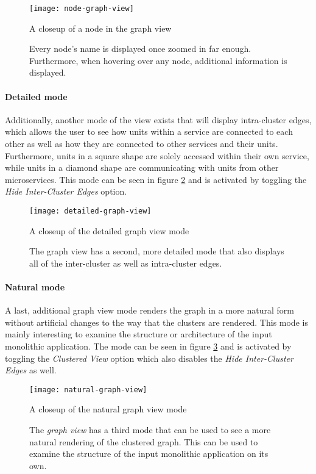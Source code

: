 \documentclass[12pt,a4paper]{report}
\begin{document}
\begin{figure}[htbp]
\centering
\texttt{[image: node-graph-view]}
\caption{A closeup of a node in the graph view}
\caption*{\centering
  Every node's name is displayed once zoomed in far enough.
  Furthermore, when hovering over any node, additional information is displayed.
}
\label{fig:node-graph-view}
\end{figure}

\paragraph{Detailed mode}
Additionally, another mode of the view exists that
will display intra-cluster edges, which allows the user to see how units within
a service are connected to each other as well as how they are connected to
other services and their units. Furthermore, units in a square shape are solely
accessed within their own service, while units in a diamond shape are
communicating with units from other microservices. This mode can be seen in
figure \ref{fig:detailed-graph-view} and is activated by toggling the \textit{
Hide Inter-Cluster Edges} option.

\begin{figure}[htbp]
\centering
\texttt{[image: detailed-graph-view]}
\caption{A closeup of the detailed graph view mode}
\caption*{\centering
  The graph view has a second, more detailed mode that also displays
  all of the inter-cluster as well as intra-cluster edges.
}
\label{fig:detailed-graph-view}
\end{figure}

\paragraph{Natural mode}
A last, additional graph view mode renders the graph
in a more natural form without artificial changes to the way that the clusters
are rendered. This mode is mainly interesting to examine the structure or
architecture of the input monolithic application. The mode can be seen in
figure \ref{fig:natural-graph-view} and is activated by toggling the \textit{
Clustered View} option which also disables the \textit{Hide Inter-Cluster
Edges} as well.

\begin{figure}[htbp]
\centering
\texttt{[image: natural-graph-view]}
\caption{A closeup of the natural graph view mode}
\caption*{\centering
  The \textit{graph view} has a third mode that can be used to see a more
  natural rendering of the clustered graph. This can be used to examine
  the structure of the input monolithic application on its own.
}
\label{fig:natural-graph-view}
\end{figure}
\end{document}
